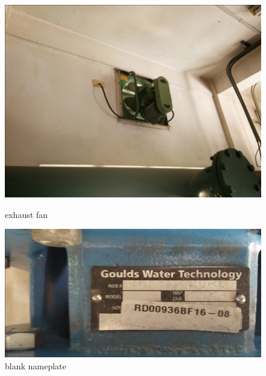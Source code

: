 \begin{figure}[!htb]	
	\begin{minipage}[b]{0.3\linewidth}
		\centering
		\includegraphics[width=\textwidth]{figures/fig_ch043_exfan}
		\caption{exhaust fan}
		\label{fig_ch043_exfan}
	\end{minipage}
	\hspace{0.05cm}
	\begin{minipage}[b]{0.3\linewidth}
		\centering
		\includegraphics[width=\textwidth]{figures/fig_ch043_nonameplate}
		\caption{blank nameplate}
		\label{fig_ch043_nonameplate}
	\end{minipage}
	\hspace{0.05cm}
	\begin{minipage}[b]{0.3\linewidth}
		\centering

\end{minipage}
\end{figure}
